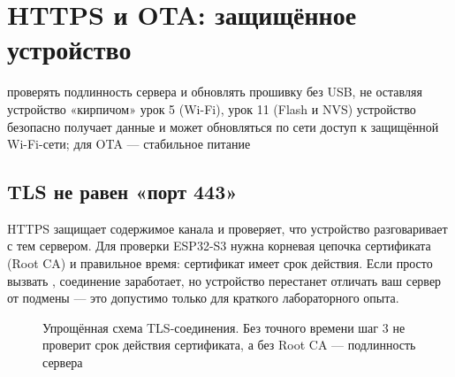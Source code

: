 \section{HTTPS и OTA: защищённое устройство}
\lessonintro
  {проверять подлинность сервера и обновлять прошивку без USB, не оставляя устройство «кирпичом»}
  {урок 5 (Wi-Fi), урок 11 (Flash и NVS)}
  {устройство безопасно получает данные и может обновляться по сети}
  {доступ к защищённой Wi-Fi-сети; для OTA --- стабильное питание}

\subsection{TLS не равен «порт 443»}

HTTPS защищает содержимое канала и проверяет, что устройство разговаривает с тем сервером. Для
проверки ESP32-S3 нужна корневая цепочка сертификата (Root CA) и правильное время: сертификат имеет
срок действия. Если просто вызвать , соединение заработает, но устройство
перестанет отличать ваш сервер от подмены --- это допустимо только для краткого лабораторного опыта.

\begin{figure}[H]
\centering
{}
\caption{Упрощённая схема TLS-соединения. Без точного времени шаг 3 не проверит срок действия
сертификата, а без Root CA --- подлинность сервера}
\end{figure}

